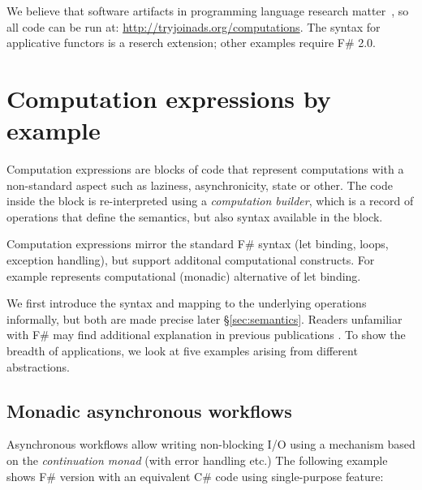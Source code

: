 \documentclass[runningheads,a4paper]{llncs}
\begin{document}
\vspace{1.0em}
\noindent
We believe that software artifacts in programming language research matter~\cite{artifacts}, so all 
code can be run at: \url{http://tryjoinads.org/computations}. 
The syntax for applicative functors is a reserch extension; other examples require F\# 2.0.


\section{Computation expressions by example}
\label{sec:intro}

Computation expressions are blocks of code that represent computations with a non-standard 
aspect such as laziness, asynchronicity, state or other. The code inside the block is re-interpreted 
using a \emph{computation builder}, which is a record of operations that define the semantics,
but also syntax available in the block.

Computation expressions mirror the standard F\# syntax (let binding, loops, exception handling),
but support additonal computational constructs. For example  represents computational 
(monadic) alternative of let binding.

We first introduce the syntax and mapping to the underlying operations informally, but both are made 
precise later \S\ref{sec:semantics}. Readers unfamiliar with F\# may find additional explanation
in previous publications \cite{fsharp-expert,fsharp-spec}. To show the breadth of applications, 
we look at five examples arising from different abstractions.


\subsection{Monadic asynchronous workflows}
\label{sec:intro-async}

Asynchronous workflows \cite{fs-async} allow writing non-blocking I/O using a mechanism based on the 
\emph{continuation monad} (with error handling etc.) The following example shows F\# version
with an equivalent C\# code using single-purpose feature:
\end{document}
